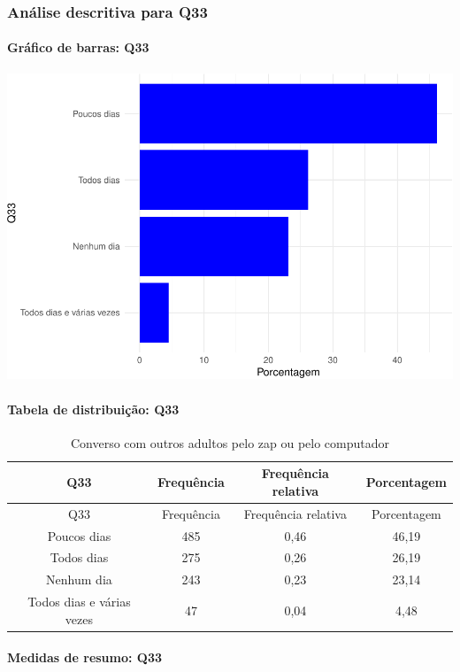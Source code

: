 \documentclass[]{article}
\let\oldparagraph\paragraph
\renewcommand{\paragraph}[1]{\oldparagraph{#1}\mbox{}}
\begin{document}
\hypertarget{anuxe1lise-descritiva-para-q33}{%
\subsubsection{Análise descritiva para Q33}\label{anuxe1lise-descritiva-para-q33}}

\hypertarget{gruxe1fico-de-barras-q33}{%
\paragraph{Gráfico de barras: Q33}\label{gruxe1fico-de-barras-q33}}

\begin{center}\includegraphics[width=0.75\linewidth]{relatorio_covid19_files/figure-latex/unnamed-chunk-1131-1} \end{center}

\hypertarget{tabela-de-distribuiuxe7uxe3o-q33}{%
\paragraph{Tabela de distribuição: Q33}\label{tabela-de-distribuiuxe7uxe3o-q33}}

\begin{longtable}[]{@{}cccc@{}}
\caption{\label{tab:unnamed-chunk-1132}Converso com outros adultos pelo zap ou pelo computador}\tabularnewline
\toprule
Q33 & Frequência & Frequência relativa & Porcentagem\tabularnewline
\midrule
\endfirsthead
\toprule
Q33 & Frequência & Frequência relativa & Porcentagem\tabularnewline
\midrule
\endhead
Poucos dias & 485 & 0,46 & 46,19\tabularnewline
Todos dias & 275 & 0,26 & 26,19\tabularnewline
Nenhum dia & 243 & 0,23 & 23,14\tabularnewline
Todos dias e várias vezes & 47 & 0,04 & 4,48\tabularnewline
\bottomrule
\end{longtable}

\hypertarget{medidas-de-resumo-q33}{%
\paragraph{Medidas de resumo: Q33}\label{medidas-de-resumo-q33}}
\end{document}
